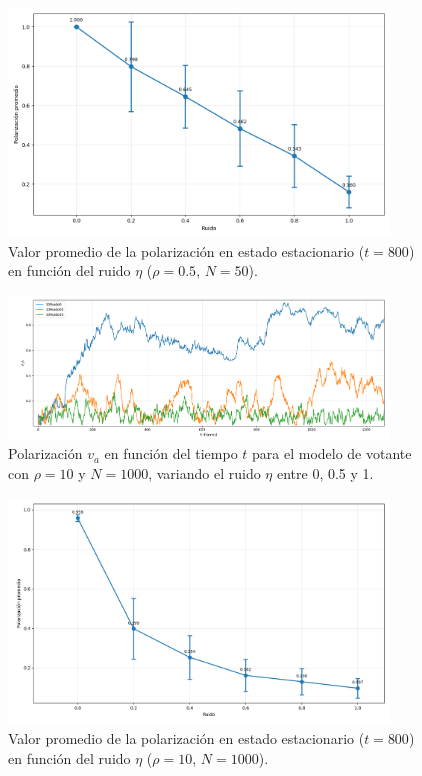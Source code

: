 \documentclass{article}
\begin{document}
\begin{figure}[H]
\centering
\includegraphics[width=0.9\textwidth]{Average voter dens 05 variando ruido.png}
\caption{Valor promedio de la polarización en estado estacionario ($t=800$) en función del ruido $\eta$ ($\rho = 0.5$, $N = 50$).}
\label{fig:promedio_va_eta_voter}
\end{figure}

\begin{figure}[H]
\centering
\includegraphics[width=0.9\textwidth]{Voter Densidad 10 Variando ruido.png}
\caption{Polarización $v_a$ en función del tiempo $t$ para el modelo de votante con $\rho = 10$ y $N = 1000$, variando el ruido $\eta$ entre 0, 0.5 y 1.}
\label{fig:va_vs_eta_voter2}
\end{figure}

\begin{figure}[H]
\centering
\includegraphics[width=0.9\textwidth]{Average voter dens 10 variando ruido.png}
\caption{Valor promedio de la polarización en estado estacionario ($t  = 800$) en función del ruido $\eta$ ($\rho = 10$, $N = 1000$).}
\label{fig:promedio_va_eta_voter2}
\end{figure}
\end{document}
